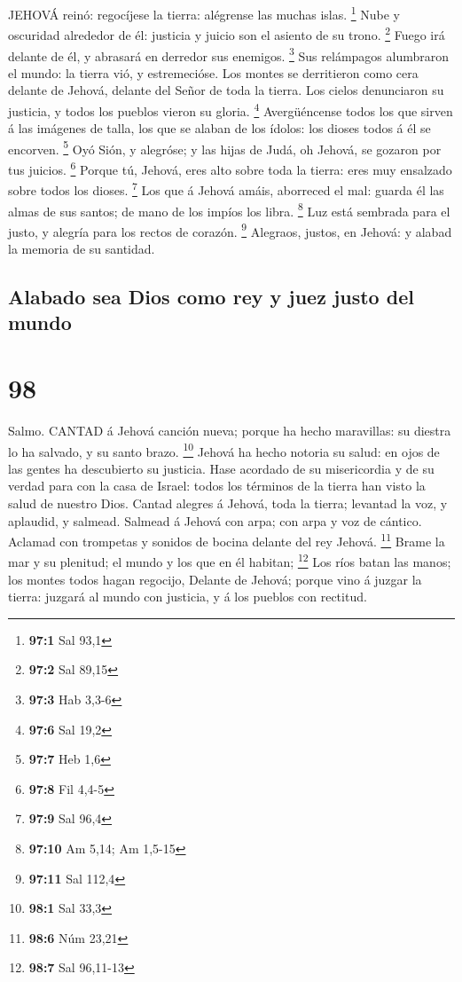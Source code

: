  JEHOVÁ reinó: regocíjese la tierra: alégrense las muchas
islas. \footnote{\textbf{97:1} Sal 93,1}  Nube y oscuridad
alrededor de él: justicia y juicio son el asiento de su trono.
\footnote{\textbf{97:2} Sal 89,15}  Fuego irá delante de él,
y abrasará en derredor sus enemigos. \footnote{\textbf{97:3} Hab 3,3-6}
 Sus relámpagos alumbraron el mundo: la tierra vió, y
estremecióse.  Los montes se derritieron como cera delante
de Jehová, delante del Señor de toda la tierra.  Los cielos
denunciaron su justicia, y todos los pueblos vieron su gloria.
\footnote{\textbf{97:6} Sal 19,2}  Avergüéncense todos los
que sirven á las imágenes de talla, los que se alaban de los ídolos: los
dioses todos á él se encorven. \footnote{\textbf{97:7} Heb 1,6}
 Oyó Sión, y alegróse; y las hijas de Judá, oh Jehová, se
gozaron por tus juicios. \footnote{\textbf{97:8} Fil 4,4-5} 
Porque tú, Jehová, eres alto sobre toda la tierra: eres muy ensalzado
sobre todos los dioses. \footnote{\textbf{97:9} Sal 96,4} 
Los que á Jehová amáis, aborreced el mal: guarda él las almas de sus
santos; de mano de los impíos los libra. \footnote{\textbf{97:10} Am
  5,14; Am 1,5-15}  Luz está sembrada para el justo, y
alegría para los rectos de corazón. \footnote{\textbf{97:11} Sal 112,4}
 Alegraos, justos, en Jehová: y alabad la memoria de su
santidad.

\hypertarget{alabado-sea-dios-como-rey-y-juez-justo-del-mundo}{%
\subsection{Alabado sea Dios como rey y juez justo del
mundo}\label{alabado-sea-dios-como-rey-y-juez-justo-del-mundo}}

\hypertarget{section-97}{%
\section{98}\label{section-97}}

 Salmo. CANTAD á Jehová canción nueva; porque ha hecho
maravillas: su diestra lo ha salvado, y su santo brazo. \footnote{\textbf{98:1}
  Sal 33,3}  Jehová ha hecho notoria su salud: en ojos de
las gentes ha descubierto su justicia.  Hase acordado de su
misericordia y de su verdad para con la casa de Israel: todos los
términos de la tierra han visto la salud de nuestro Dios. 
Cantad alegres á Jehová, toda la tierra; levantad la voz, y aplaudid, y
salmead.  Salmead á Jehová con arpa; con arpa y voz de
cántico.  Aclamad con trompetas y sonidos de bocina delante
del rey Jehová. \footnote{\textbf{98:6} Núm 23,21}  Brame la
mar y su plenitud; el mundo y los que en él habitan; \footnote{\textbf{98:7}
  Sal 96,11-13}  Los ríos batan las manos; los montes todos
hagan regocijo,  Delante de Jehová; porque vino á juzgar la
tierra: juzgará al mundo con justicia, y á los pueblos con rectitud.

